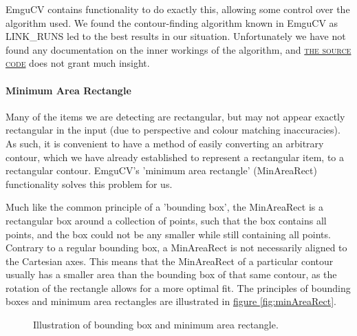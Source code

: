 \documentclass[10pt, abstracton, twocolumn]{scrartcl}
\newcommand{\fref}[1]{\hyperref[#1]{figure \vref{#1}}}
\newcommand{\link}[2]{\textsc{\href{#1}{#2}}}
\begin{document}
EmguCV contains functionality to do exactly this, allowing some control over the algorithm used. We found the contour-finding algorithm known in EmguCV as LINK\_RUNS led to the best results in our situation. Unfortunately we have not found any documentation on the inner workings of the algorithm, and \link{https://github.com/Itseez/opencv/blob/bad927325fc9b73ad449fd46f8856a2cea448390/modules/imgproc/src/contours.cpp\#L129}{the source code} does not grant much insight.

\paragraph{Minimum Area Rectangle}
Many of the items we are detecting are rectangular, but may not appear exactly rectangular in the input (due to perspective and colour matching inaccuracies). As such, it is convenient to have a method of easily converting an arbitrary contour, which we have already established to represent a rectangular item, to a rectangular contour. EmguCV's 'minimum area rectangle' (MinAreaRect) functionality solves this problem for us.

Much like the common principle of a 'bounding box', the MinAreaRect is a rectangular box around a collection of points, such that the box contains all points, and the box could not be any smaller while still containing all points. Contrary to a regular bounding box, a MinAreaRect is not necessarily aligned to the Cartesian axes. This means that the MinAreaRect of a particular contour usually has a smaller area than the bounding box of that same contour, as the rotation of the rectangle allows for a more optimal fit. The principles of bounding boxes and minimum area rectangles are illustrated in \fref{fig:minAreaRect}.

\begin{figure}[h]
        \centering
        \begin{subfigure}[t]{0.30\columnwidth}
        \centering
        
        \end{subfigure}
        \begin{subfigure}[t]{0.30\columnwidth}
        \centering
        
        \end{subfigure}
        \begin{subfigure}[t]{0.30\columnwidth}
        \centering
        
        \end{subfigure}
        \caption{\small Illustration of bounding box and minimum area rectangle.}
        \label{fig:minAreaRect}
\end{figure}
\end{document}
